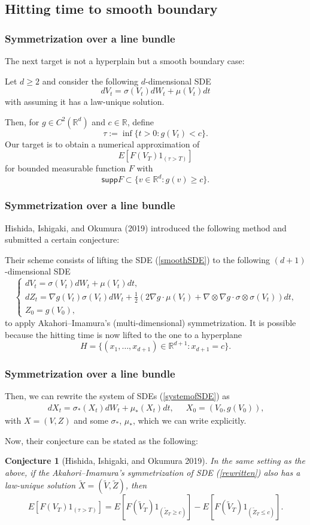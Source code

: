 \documentclass[dvipdfmx,11pt]{beamer}		%
\newtheorem{conj}[defi]{Conjecture}
\newcommand{\R}{\mathbb{R}}
\begin{document}
\subsection{Hitting time to smooth boundary}
%
\begin{frame}\frametitle{Symmetrization over a line bundle}
	The next target is not a hyperplain but a smooth boundary case:
	
	Let \( d \ge 2 \) and consider the following \(d\)-dimensional SDE
	\[
		dV_t = \sigma(V_t)dW_t + \mu(V_t)dt	\tag{c}\label{smoothSDE}
	\]
	with assuming it has a law-unique solution.
	
	Then, for \( g \in C^2(\R^d) \) and \( c \in \R \), define
	\[
		\tau := \inf\{ t > 0 \colon g(V_t) < c \}\text{.}
	\]
	Our target is to obtain a numerical approximation of
	\[
		E[ F(V_T) 1_{(\tau>T)} ]
	\]
	for bounded measurable function \( F \) with
	\[
		\mathsf{supp}F \subset \{ v \in \R^d \colon g(v) \ge c \} \text{.}
	\]
\end{frame}
%
\begin{frame}\frametitle{Symmetrization over a line bundle}
	{\quad}Hishida, Ishigaki, and Okumura (2019) introduced the following method and submitted a certain conjecture:
	
	{\quad}Their scheme consists of lifting the SDE (\ref{smoothSDE}) to the following \( (d+1) \)-dimensional SDE
	\[
		\begin{cases}
			dV_t = \sigma(V_t)dW_t + \mu(V_t)dt\text{,}	\\
			dZ_t = \nabla g(V_t) \sigma(V_t) dW_t + \frac{1}{2} \left( 2\nabla g \cdot \mu(V_t) + \nabla \otimes \nabla g \cdot \sigma \otimes \sigma (V_t) \right) dt \text{,}	\\
			Z_0 = g( V_0 )\text{,}
		\end{cases}		\tag{d}\label{systemofSDE}
	\]
	to apply Akahori--Imamura's (multi-dimensional) symmetrization. It is possible because the hitting time is now lifted to the one to a hyperplane
	\[
		H = \{ (x_1,\dots, x_{d+1}) \in \R^{d+1} \colon x_{d+1} = c \}\text{.}
	\]
\end{frame}
%
\begin{frame}\frametitle{Symmetrization over a line bundle}
	Then, we can rewrite the system of SDEs (\ref{systemofSDE}) as
	\begin{align*}
		dX_t = \sigma_*(X_t) dW_t + \mu_*(X_t) dt\text{,}	&&	X_0 = (V_0,g(V_0))\text{,}	\tag{e}\label{rewritten}
	\end{align*}
	with \( X = (V,Z) \) and some \( \sigma_* \), \(\mu_* \), which we can write explicitly.
	
	Now, their conjecture can be stated as the following:
	\begin{conj}[Hishida, Ishigaki, and Okumura 2019]
		In the same setting as the above, if the Akahori--Imamura's symmetrization of SDE (\ref{rewritten}) also has a law-unique solution \( \tilde{X} = ( \tilde{V}, \tilde{Z}) \), then
		\[
			E[ F(V_T) 1_{(\tau>T)} ] = E[ F(\tilde{V}_T) 1_{( \tilde{Z}_T \ge c )} ] - E[ F(\tilde{V}_T) 1_{( \tilde{Z}_T \le c )} ]\text{.}
		\]
	\end{conj}
\end{frame}
\end{document}
